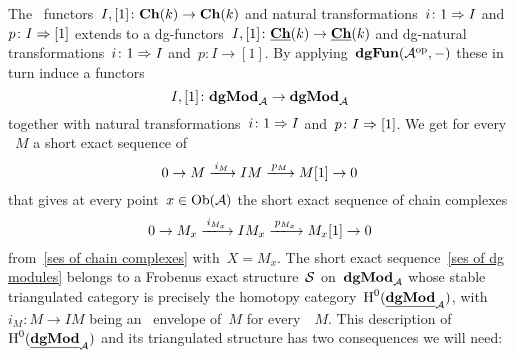 \documentclass[a4paper,10pt]{scrartcl}
\begin{document}
The~{\klinear} functors~$I, [1] \colon \mathbf{Ch}(k) \to \mathbf{Ch}(k)$ and natural transformations~$i \colon 1 \Rightarrow I$ and~$p \colon I \Rightarrow [1]$ extends to a dg-functors~$I, [1] \colon \underline{\mathbf{Ch}}(k) \to \underline{\mathbf{Ch}}(k)$ and dg-natural transformations~$i \colon 1 \Rightarrow I$ and~$p \colon I \to [1]$.
By applying~$\mathbf{dgFun}(\mathcal{A}^{{\mathrm{op}}}, -)$ these in turn induce a {\klinear} functors
\[
  I, [1]
  \colon
  \mathbf{dgMod}_{\mathcal{A}}
  \to
  \mathbf{dgMod}_{\mathcal{A}}
\]
together with natural transformations~$i \colon 1 \Rightarrow I$ and~$p \colon I \Rightarrow [1]$.
We get for every {\dgmodule{$\Acat$}}~$M$ a short exact sequence of~{\dgmodules{$\Acat$}}
\begin{equation}
  \label{ses of dg modules}
  0
  \to
  M
  \xlongto{i_M}
  IM
  \xlongto{p_M}
  M[1]
  \to
  0
\end{equation}
that gives at every point~$x \in \operatorname{Ob}(\mathcal{A})$ the short exact sequence of chain complexes
\[
  0
  \to
  M_x
  \xlongto{i_{M_x}}
  IM_x
  \xlongto{p_{M_x}}
  M_x[1]
  \to
  0
\]
from~\eqref{ses of chain complexes} with~$X = M_x$.
The short exact sequence~\eqref{ses of dg modules} belongs to a Frobenus exact structure~$\Sfrob$ on~$\mathbf{dgMod}_{\mathcal{A}}$ whose stable triangulated category is precisely the homotopy category~$\operatorname{H}^0(\underline{\mathbf{dgMod}}_{\mathcal{A}})$, with~$i_M \colon M \to IM$ being an~{\injective{$\Sfrob$}} envelope of~$M$ for every~{\dgmodule{$\Acat$}}~$M$.
This description of~$\operatorname{H}^0(\underline{\mathbf{dgMod}}_{\mathcal{A}})$ and its triangulated structure has two consequences we will need:
\end{document}
